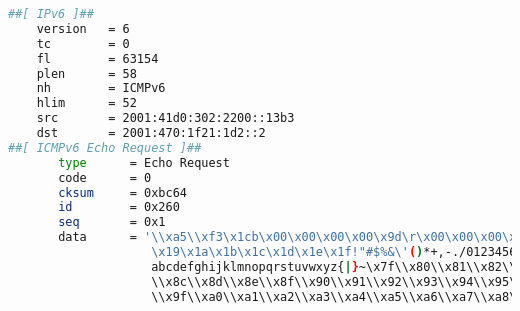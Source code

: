 \begin{lstlisting}[language=bash, basicstyle=\ttfamily\tiny, showstringspaces=false]
##[ IPv6 ]##
    version   = 6
    tc        = 0
    fl        = 63154
    plen      = 58
    nh        = ICMPv6
    hlim      = 52
    src       = 2001:41d0:302:2200::13b3
    dst       = 2001:470:1f21:1d2::2
##[ ICMPv6 Echo Request ]##
       type      = Echo Request
       code      = 0
       cksum     = 0xbc64
       id        = 0x260
       seq       = 0x1
       data      = '\\xa5\\xf3\x1cb\x00\x00\x00\x00\x9d\r\x00\x00\x00\x00\x00\x10\x1 1\x12\x13\x14\x15\x16\x17\x18
                    \x19\x1a\x1b\x1c\x1d\x1e\x1f!"#$%&\'()*+,-./0123456789:;<=>?@ABCDEFGHIJKLMNOPQRSTUVWXYZ[\\]^_`
                    abcdefghijklmnopqrstuvwxyz{|}~\x7f\\x80\\x81\\x82\\x83\\x84\\x85\\x86\\x87\\x88\\x89\\x8a\\x8b
                    \\x8c\\x8d\\x8e\\x8f\\x90\\x91\\x92\\x93\\x94\\x95\\x96\\x97\\x98\\x99\\x9a\\x9b\\x9c\\x9d\\x9e
                    \\x9f\\xa0\\xa1\\xa2\\xa3\\xa4\\xa5\\xa6\\xa7\\xa8\\xa9\\xaa\\xab\\xac\\xad\\xae\\xaf\\xb0\\xb1

\end{lstlisting}
